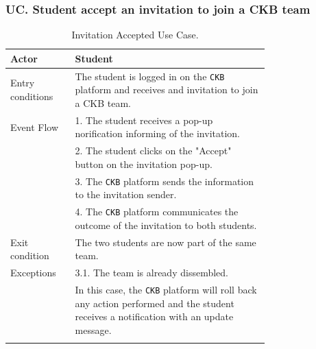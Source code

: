 \subsubsection*{UC\cuc . Student accept an invitation to join a CKB team}
\begin{center}
    \begin{longtable}{lp{0.75\linewidth}}
        \hline
        Actor            & Student                                                                                                                                                                               \\
        \hline
        Entry conditions & The student is logged in on the \verb|CKB| platform and receives and invitation to join a CKB team.                                                                                                               \\
        \hline
        Event Flow       
        & 1. The student receives a pop-up norification informing of the invitation.\\
        & 2. The student clicks on the "Accept" button on the invitation pop-up.\\
        & 3. The \verb|CKB| platform sends the information to the invitation sender.\\
        & 4. The \verb|CKB| platform communicates the outcome of the invitation to both students.\\
        \hline
        Exit condition   & The two students are now part of the same team.\\                                                                                                                                                                           
        \hline
        Exceptions   
        & 3.1. The team is already dissembled.\\                                          
            & In this case, the \verb|CKB| platform will roll back any action performed and the student receives a notification with an update message.\\                                                               
        \hline
        \caption{Invitation Accepted Use Case.}
        \label{tab: invitation_accepted_use_case}
    \end{longtable}


\end{center}
